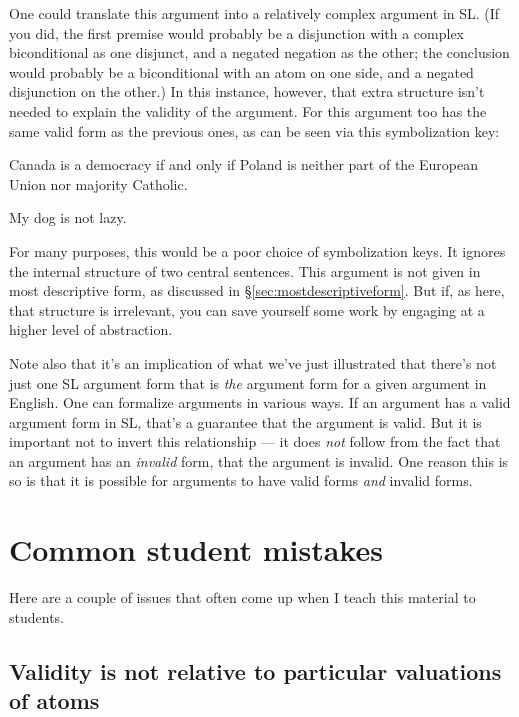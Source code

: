 One could translate this argument into a relatively complex argument in SL. (If you did, the first premise would probably be a disjunction with a complex biconditional as one disjunct, and a negated negation as the other; the conclusion would probably be a biconditional with an atom on one side, and a negated disjunction on the other.) In this instance, however, that extra structure isn't needed to explain the validity of the argument. For this argument too has the same valid form as the previous ones, as can be seen via this symbolization key:

\begin{ekey}
\item[Q:] Canada is a democracy if and only if Poland is neither part of the European Union nor majority Catholic.
\item[P:] My dog is not lazy.
\end{ekey}

For many purposes, this would be a poor choice of symbolization keys. It ignores the internal structure of two central sentences. This argument is not given in most descriptive form, as discussed in \S\ref{sec:mostdescriptiveform}. But if, as here, that structure is irrelevant, you can save yourself some work by engaging at a higher level of abstraction.

Note also that it's an implication of what we've just illustrated that there's not just one SL argument form that is \emph{the} argument form for a given argument in English. One can formalize arguments in various ways. If an argument has a valid argument form in SL, that's a guarantee that the argument is valid. But it is important not to invert this relationship --- it does \emph{not} follow from the fact that an argument has an \emph{invalid} form, that the argument is invalid. One reason this is so is that it is possible for arguments to have valid forms \emph{and} invalid forms.

\section{Common student mistakes}

Here are a couple of issues that often come up when I teach this material to students.

\subsection{Validity is not relative to particular valuations of atoms}

